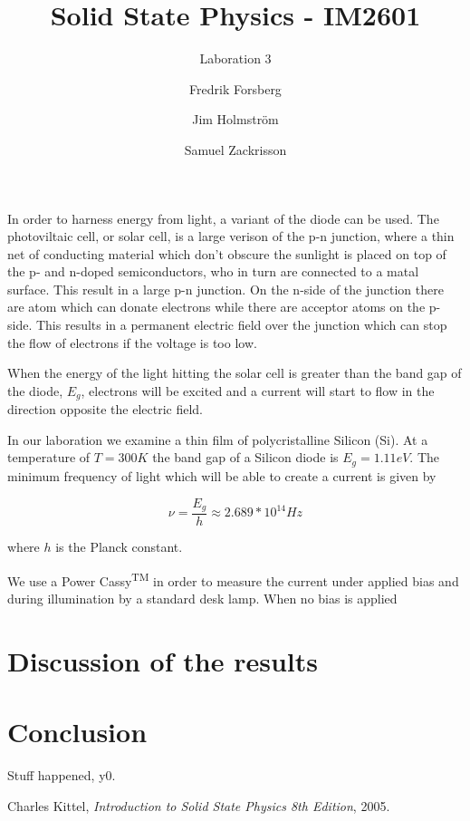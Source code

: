 \documentclass[a4paper,twoside=false,abstract=false,numbers=noenddot,
titlepage=false,headings=small,parskip=half,version=last]{scrartcl}
\title{Solid State Physics - IM2601}
\subtitle{Laboration 3}
\author[1]{Fredrik Forsberg}
\author[1]{Jim Holmström}
\author[1]{Samuel Zackrisson}
\affil[1]{Engineering Physics, Royal Institute of Technology}
\affil[1]{\{fforsber, jimho, samuelz\}@kth.se}
\begin{document}
\maketitle
\thispagestyle{empty}


In order to harness energy from light, a variant of the diode can be used. The photoviltaic cell, or solar cell, is a large verison of the p-n junction, where a thin net of conducting material which don't obscure the sunlight is placed on top of the p- and n-doped semiconductors, who in turn are connected to a matal surface. This result in a large p-n junction. On the n-side of the junction there are atom which can donate electrons while there are acceptor atoms on the p-side. This results in a permanent electric field over the junction which can stop the flow of electrons if the voltage is too low.

When the energy of the light hitting the solar cell is greater than the band gap of the diode, $E_g$, electrons will be excited and a current will start to flow in the direction opposite the electric field.



In our laboration we examine a thin film of polycristalline Silicon (Si). At a temperature of $T = 300 K$ the band gap of a Silicon diode is $E_g=1.11 eV$. The minimum frequency of light which will be able to create a current is given by

$$\nu = \frac{E_g}{h} \approx 2.689*10^{14} Hz$$

where $h$ is the Planck constant.


We use a Power Cassy\textsuperscript{TM} in order to measure the current under applied bias and during illumination by a standard desk lamp. When no bias is applied 

\section{Discussion of the results}

\section{Conclusion}
Stuff happened, y0.

\begin{thebibliography}{1}
        Charles Kittel,
        {\em Introduction to Solid State Physics 8th Edition},
        2005.
\end{thebibliography}
\end{document}
